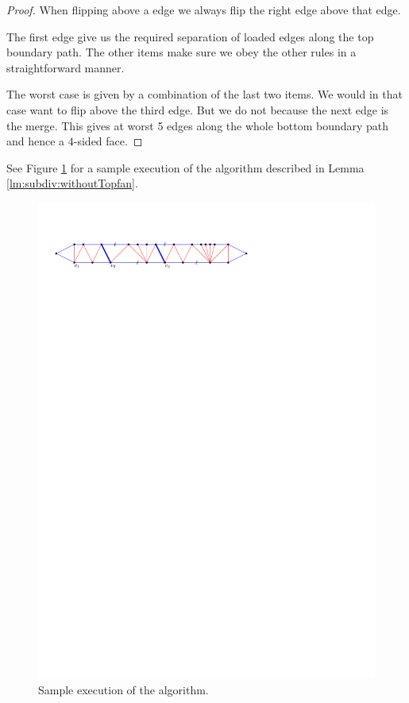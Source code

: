 \begin{proof}
  When flipping above a edge we always flip the right edge above that edge.

  The first edge give us the required separation of loaded edges along the top boundary path. The other items make sure we obey the other rules in a straightforward manner.

  The worst case is given by a combination of the last two items. We would in that case want to flip above the third edge. But we do not because the next edge is the merge. This gives at worst 5 edges along the whole bottom boundary path and hence a $4$-sided face.
  \end{proof}

  See Figure \ref{fig:subdiv:sampleExecution} for a sample execution of the algorithm described in Lemma \ref{lm:subdiv:withoutTopfan}.

  \begin{figure}[h]
    \centering
    \includegraphics[scale=1]{blueFaceSubdivision/img/sampleExecution}
    \caption{Sample execution of the algorithm.}
    \label{fig:subdiv:sampleExecution}
  \end{figure}


